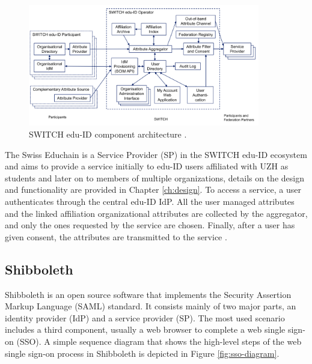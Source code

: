 \begin{figure}[h]
	\centering
	\captionsetup{width=.8\linewidth}
	\includegraphics[width=0.9\textwidth]{figs/ch3/eduid-architecture}
	\caption{SWITCH edu-ID component architecture \cite{eduid-architecture}.}
	\label{fig:eduid-architecture}
\end{figure}

The Swiss Educhain is a Service Provider (SP) in the SWITCH edu-ID ecosystem and aims to provide a service initially to edu-ID users affiliated with UZH as students and later on to members of multiple organizations, details on the design and functionality are provided in Chapter \ref{ch:design}. To access a service, a user authenticates through the central edu-ID IdP. All the user managed attributes and the linked affiliation organizational attributes are collected by the aggregator, and only the ones requested by the service are chosen. Finally, after a user has given consent, the attributes are transmitted to the service \cite{eduid-architecture}.


\subsection{Shibboleth} \label{ssec:shibboleth-related-work}

Shibboleth is an open source software that implements the Security Assertion Markup Language (SAML) standard. It consists mainly of two major parts, an identity provider (IdP) and a service provider (SP). The most used scenario includes a third component, usually a web browser to complete a web single sign-on (SSO). A simple sequence diagram that shows the high-level steps of the web single sign-on process in Shibboleth is depicted in Figure \ref{fig:sso-diagram}. 

